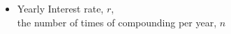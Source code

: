 \documentclass[preview]{standalone}
\begin{document}
\begin{center}
\begin{itemize} \item Yearly Interest rate, $r$, \\ the number of times of compounding per year, $n$ \\ \end{itemize}
\end{center}
\end{document}
